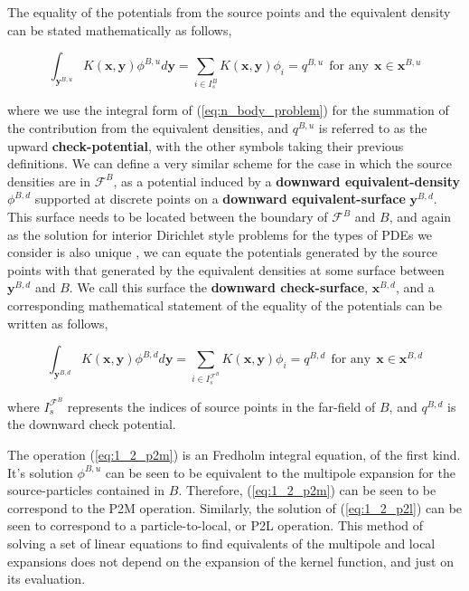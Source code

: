 The equality of the potentials from the source points and the equivalent density
can be stated mathematically as follows,

\begin{equation}
\int_{\mathbf{y}^{B,u}} K(\mathbf{x}, \mathbf{y})\phi^{B, u} d\mathbf{y} = \sum_{i \in I_s^B} K(\mathbf{x}, \mathbf{y})\phi_i = q^{B, u} \> \> \text{for any} \> \> \mathbf{x} \in \mathbf{x}^{B, u}
\label{eq:1_2_p2m}
\end{equation}

where we use the integral form of (\ref{eq:n_body_problem}) for the summation of
the contribution from the equivalent densities, and $q^{B, u}$ is referred to as
the upward \textbf{\gls{check-potential}}, with the other symbols taking their previous
definitions. We can define a very similar scheme for the case in which the source
densities are in $\mathcal{F}^B$, as a potential induced by a
\textbf{downward \gls{equivalent-density}} $\phi^{B,d}$ supported at discrete points
on a \textbf{downward \gls{equivalent-surface}} $\mathbf{y}^{B,d}$. This surface
needs to be located between the boundary of $\mathcal{F}^B$ and $B$, and again
as the solution for interior Dirichlet style problems for the types of PDEs we
consider is also unique \cite{Ying:2004:JCP}, we can equate the potentials generated
by the source points with that generated by the equivalent densities at some surface
between $\mathbf{y}^{B,d}$ and $B$. We call this surface the \textbf{downward \gls{check-surface}},
$\mathbf{x}^{B,d}$, and a corresponding mathematical statement of the equality of
the potentials can be written as follows,

\begin{equation}
    \int_{\mathbf{y}^{B,d}} K(\mathbf{x}, \mathbf{y})\phi^{B, d} d\mathbf{y} = \sum_{i \in I_s^{\mathcal{F}^B}} K(\mathbf{x}, \mathbf{y})\phi_i = q^{B, d} \> \> \text{for any} \> \> \mathbf{x} \in \mathbf{x}^{B, d}
    \label{eq:1_2_p2l}
\end{equation}

where $I_s^{\mathcal{F}^B}$ represents the indices of source points in the \gls{far-field}
of $B$, and $q^{B, d}$ is the downward check potential.

The operation (\ref{eq:1_2_p2m}) is an Fredholm integral
equation, of the first kind. It's solution $\phi^{B, u}$ can be seen to be equivalent
to the multipole expansion for the \gls{source-particles} contained in $B$. Therefore,
(\ref{eq:1_2_p2m}) can be seen to be correspond to the \gls{P2M}
operation. Similarly, the solution of (\ref{eq:1_2_p2l}) can be seen
to correspond to a particle-to-local, or P2L operation. This method of solving
a set of linear equations to find equivalents of the multipole and local expansions
does not depend on the expansion of the kernel function, and just on its evaluation.

